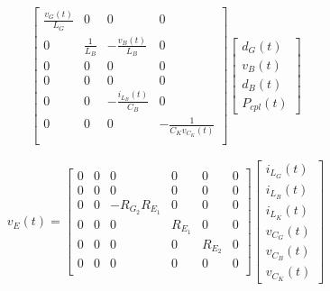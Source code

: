 \documentclass{article}
\newcommand{\ds}{\displaystyle}
\begin{document}
\begin{gather}
  \begin{bmatrix}
    \ds \frac{v_G(t)}{L_G} & 0                 & 0                            & 0                              \\[12pt]
    0                      & \ds \frac{1}{L_B} & \ds - \frac{v_B(t)}{L_B}     & 0                              \\[12pt]
    0                      & 0                 & 0                            & 0                              \\[12pt]
    0                      & 0                 & 0                            & 0                              \\[12pt]
    0                      & 0                 & - \ds \frac{i_{L_B}(t)}{C_B} & 0                              \\[12pt]
    0                      & 0                 & 0                            & - \ds \frac{1}{C_K v_{C_K}(t)} \\[12pt]
  \end{bmatrix}
  \begin{bmatrix}
    d_G(t) \\ v_B(t) \\ d_B(t) \\ P_{cpl}(t)
  \end{bmatrix}
\end{gather}

\begin{equation}
  v_E(t) =
  \begin{bmatrix}
    0 & 0 & 0                 & 0       & 0       & 0 \\[12pt]
    0 & 0 & 0                 & 0       & 0       & 0 \\[12pt]
    0 & 0 & - R_{G_2} R_{E_1} & 0       & 0       & 0 \\[12pt]
    0 & 0 & 0                 & R_{E_1} & 0       & 0 \\[12pt]
    0 & 0 & 0                 & 0       & R_{E_2} & 0 \\[12pt]
    0 & 0 & 0                 & 0       & 0       & 0 \\[12pt]
  \end{bmatrix}
  \begin{bmatrix}
    i_{L_G}(t) \\[12pt] i_{L_B}(t) \\[12pt] i_{L_K}(t) \\[12pt]
    v_{C_G}(t) \\[12pt] v_{C_B}(t) \\[12pt] v_{C_K}(t)
  \end{bmatrix}
\end{equation}
\end{document}
